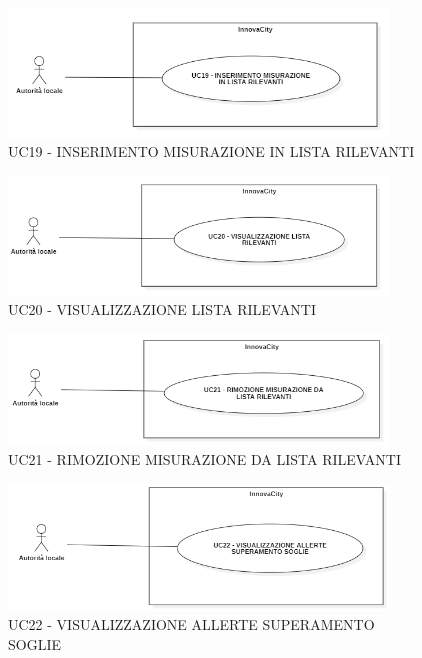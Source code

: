 \begin{figure}[H]
    \centering
    \includegraphics[width=0.9\textwidth]{../Images/uc19.PNG}
    \caption{UC19 - INSERIMENTO MISURAZIONE IN LISTA RILEVANTI}
\end{figure}

\begin{figure}[H]
    \centering
    \includegraphics[width=0.9\textwidth]{../Images/uc20.PNG}
    \caption{UC20 - VISUALIZZAZIONE LISTA RILEVANTI}
\end{figure}

\begin{figure}[H]
    \centering
    \includegraphics[width=0.9\textwidth]{../Images/uc21.PNG}
    \caption{UC21 - RIMOZIONE MISURAZIONE DA LISTA RILEVANTI}
\end{figure}

\begin{figure}[H]
    \centering
    \includegraphics[width=0.9\textwidth]{../Images/uc22.PNG}
    \caption{UC22 - VISUALIZZAZIONE ALLERTE SUPERAMENTO SOGLIE}
\end{figure}



